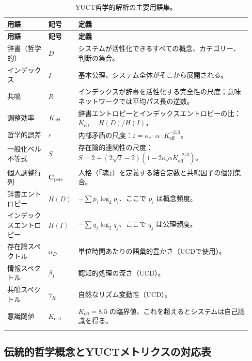 \documentclass[11pt,a4paper]{article}
\newcommand{\kappac}{\kappa_c}
\newcommand{\eps}{\varepsilon}
\newcommand{\Cpers}{\mathbf{C}_{\text{pers}}}
\begin{document}
	\begin{longtable}{p{3.5cm}p{5cm}p{4cm}}
		\toprule
		\textbf{用語} & \textbf{記号} & \textbf{定義} \\
		\midrule
		\endfirsthead
		\toprule
		\textbf{用語} & \textbf{記号} & \textbf{定義} \\
		\midrule
		\endhead
		辞書（哲学的） & \(D\) & システムが活性化できるすべての概念、カテゴリー、判断の集合。 \\
		インデックス & \(I\) & 基本公理、システム全体がそこから展開される。 \\
		共鳴 & \(R\) & インデックスが辞書を活性化する完全性の尺度；意味ネットワークでは平均パス長の逆数。 \\
		調整効率 & \(\Keff\) & 辞書エントロピーとインデックスエントロピーの比：\(K_{\mathrm{eff}} = H(D)/H(I)\)。 \\
		哲学的誤差 & \(\eps\) & 内部矛盾の尺度：\(\eps = \kappac \cdot \alpha \cdot K_{\mathrm{eff}}^{-2/3}\)。 \\
		一般化ベル不等式 & \(S\) & 存在論的連関性の尺度：\(S = 2 + (2\sqrt{2}-2)(1 - 2\kappac\alpha K_{\mathrm{eff}}^{-2/3})\)。 \\
		個人調整行列 & \(\Cpers\) & 人格（「魂」）を定義する結合定数と共鳴因子の個別集合。 \\
		辞書エントロピー & \(H(D)\) & \( -\sum p_i \log_2 p_i\)、ここで \(p_i\) は概念頻度。 \\
		インデックスエントロピー & \(H(I)\) & \( -\sum q_j \log_2 q_j\)、ここで \(q_j\) は公理頻度。 \\
		存在論スペクトル & \(\alpha_D\) & 単位時間あたりの語彙的豊かさ（UCDで使用）。 \\
		情報スペクトル & \(\beta_I\) & 認知的処理の深さ（UCD）。 \\
		共鳴スペクトル & \(\gamma_R\) & 自然なリズム変動性（UCD）。 \\
		意識閾値 & \(K_{\mathrm{crit}}\) & \(K_{\mathrm{eff}} = 8.5\) の臨界値、これを超えるとシステムは自己認識を得る。 \\
		\bottomrule
		\caption{YUCT哲学的解析の主要用語集。}
		\label{tab:glossary}
	\end{longtable}
	
	\subsection{伝統的哲学概念とYUCTメトリクスの対応表}
	
\end{document}
